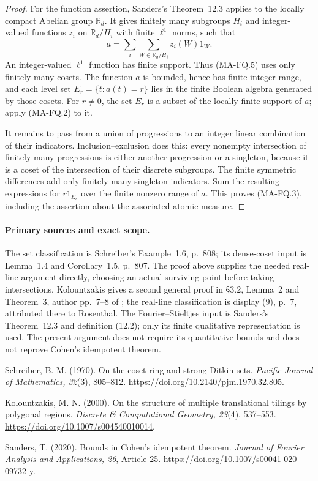 \begin{proof}
For the function assertion, Sanders's Theorem~12.3 applies to
the locally compact Abelian group $\mathbb R_d$. It gives
finitely many subgroups $H_i$ and integer-valued functions
$z_i$ on $\mathbb R_d/H_i$ with finite $\ell^1$ norms, such
that
\[
 a=\sum_i\sum_{W\in\mathbb R_d/H_i}z_i(W)1_W.
 \tag{MA-FQ.5}
\]
An integer-valued $\ell^1$ function has finite support.
Thus (MA-FQ.5) uses only finitely many cosets. The function
$a$ is bounded, hence has finite integer range, and each level
set $E_r=\{t:a(t)=r\}$ lies in the finite Boolean algebra
generated by those cosets. For $r\ne0$, the set $E_r$ is a
subset of the locally finite support of $a$; apply (MA-FQ.2)
to it.

It remains to pass from a union of progressions to an integer
linear combination of their indicators. Inclusion--exclusion
does this: every nonempty intersection of finitely many
progressions is either another progression or a singleton,
because it is a coset of the intersection of their discrete
subgroups. The finite symmetric differences add only finitely
many singleton indicators. Sum the resulting expressions for
$r1_{E_r}$ over the finite nonzero range of $a$. This proves
(MA-FQ.3), including the assertion about the associated atomic
measure.
\end{proof}

\paragraph{Primary sources and exact scope.}
The set classification is Schreiber's Example~1.6, p.~808;
its dense-coset input is Lemma~1.4 and Corollary~1.5, p.~807.
The proof above supplies the needed real-line argument directly,
choosing an actual surviving point before taking intersections.
Kolountzakis gives a second general proof in
\S3.2, Lemma~2 and Theorem~3, author pp.~7--8 of
; the real-line classification is
display (9), p.~7, attributed there to Rosenthal. The
Fourier--Stieltjes input is Sanders's Theorem~12.3 and definition
(12.2); only its finite qualitative representation is used.
The present argument does not require its quantitative bounds
and does not reprove Cohen's idempotent theorem.

Schreiber, B. M. (1970). On the coset ring and strong Ditkin
sets. \emph{Pacific Journal of Mathematics, 32}(3), 805--812.
\url{https://doi.org/10.2140/pjm.1970.32.805}.

Kolountzakis, M. N. (2000). On the structure of multiple
translational tilings by polygonal regions.
\emph{Discrete \& Computational Geometry, 23}(4), 537--553.
\url{https://doi.org/10.1007/s004540010014}.

Sanders, T. (2020). Bounds in Cohen's idempotent theorem.
\emph{Journal of Fourier Analysis and Applications, 26},
Article 25. \url{https://doi.org/10.1007/s00041-020-09732-y}.
